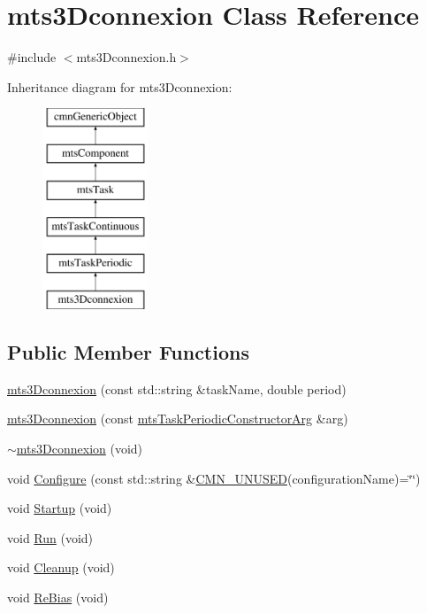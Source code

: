 \hypertarget{classmts3_dconnexion}{}\section{mts3\+Dconnexion Class Reference}
\label{classmts3_dconnexion}


{\ttfamily \#include $<$mts3\+Dconnexion.\+h$>$}

Inheritance diagram for mts3\+Dconnexion\+:\begin{figure}[H]
\begin{center}
\leavevmode
\includegraphics[height=6.000000cm]{d9/de2/classmts3_dconnexion}
\end{center}
\end{figure}
\subsection*{Public Member Functions}
\begin{DoxyCompactItemize}
\item 
\hyperlink{classmts3_dconnexion_ad49b2b97841c142d8021edfbe629d9b2}{mts3\+Dconnexion} (const std\+::string \&task\+Name, double period)
\item 
\hyperlink{classmts3_dconnexion_a630e27750245f2f3c24d046f0e4c570e}{mts3\+Dconnexion} (const \hyperlink{classmts_task_periodic_constructor_arg}{mts\+Task\+Periodic\+Constructor\+Arg} \&arg)
\item 
\hyperlink{classmts3_dconnexion_a1286e109cc2c92f6a3d11895c32f07a1}{$\sim$mts3\+Dconnexion} (void)
\item 
void \hyperlink{classmts3_dconnexion_ae5ef64e0d4f574a7f088bba86867ef94}{Configure} (const std\+::string \&\hyperlink{cmn_portability_8h_a021894e2626935fa2305434b1e893ff6}{C\+M\+N\+\_\+\+U\+N\+U\+S\+E\+D}(configuration\+Name)=\char`\"{}\char`\"{})
\item 
void \hyperlink{classmts3_dconnexion_ab436d4b2b3fb4e8b9f37851835bf4a1d}{Startup} (void)
\item 
void \hyperlink{classmts3_dconnexion_a8ea74b76b74ae0bb7e1e6c491869bfc0}{Run} (void)
\item 
void \hyperlink{classmts3_dconnexion_ae572a75acb1f734e5365854806102552}{Cleanup} (void)
\item 
void \hyperlink{classmts3_dconnexion_a2c0237a3ea1756708959c6848b8447b2}{Re\+Bias} (void)
\end{DoxyCompactItemize}
